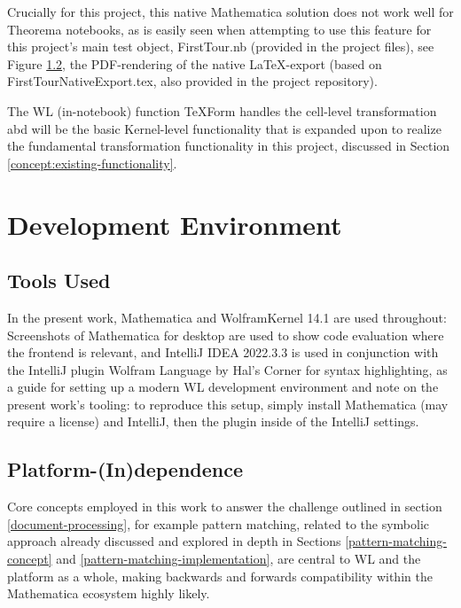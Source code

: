 Crucially for this project, this native Mathematica solution does not work well for Theorema notebooks, as is easily seen when attempting to use this feature for this project's main test object, FirstTour.nb (provided in the project files), see Figure \ref{}, the PDF-rendering of the native \LaTeX-export (based on FirstTourNativeExport.tex, also provided in the project repository).

The WL (in-notebook) function TeXForm handles the cell-level transformation abd will be the basic Kernel-level functionality that is expanded upon to realize the fundamental transformation functionality in this project, discussed in Section \ref{concept:existing-functionality}.

\section{Development Environment}

\subsection{Tools Used}

In the present work, Mathematica and WolframKernel 14.1 \cite{noauthor_wolfram_nodate} are used throughout: Screenshots of Mathematica for desktop are used to show code evaluation where the frontend is relevant, and IntelliJ IDEA 2022.3.3 \cite{noauthor_intellij_nodate} is used in conjunction with the IntelliJ plugin Wolfram Language by Hal's Corner \cite{noauthor_wolfram_nodate-1} for syntax highlighting, as a guide for setting up a modern WL development environment and note on the present work's tooling: to reproduce this setup, simply install Mathematica (may require a license) and IntelliJ, then the plugin inside of the IntelliJ settings.


\subsection{Platform-(In)dependence}

Core concepts employed in this work to answer the challenge outlined in section \ref{document-processing}, for example pattern matching, related to the symbolic approach already discussed and explored in depth in Sections \ref{pattern-matching-concept} and \ref{pattern-matching-implementation}, are central to WL and the platform as a whole, making backwards and forwards compatibility within the Mathematica ecosystem highly likely. 

